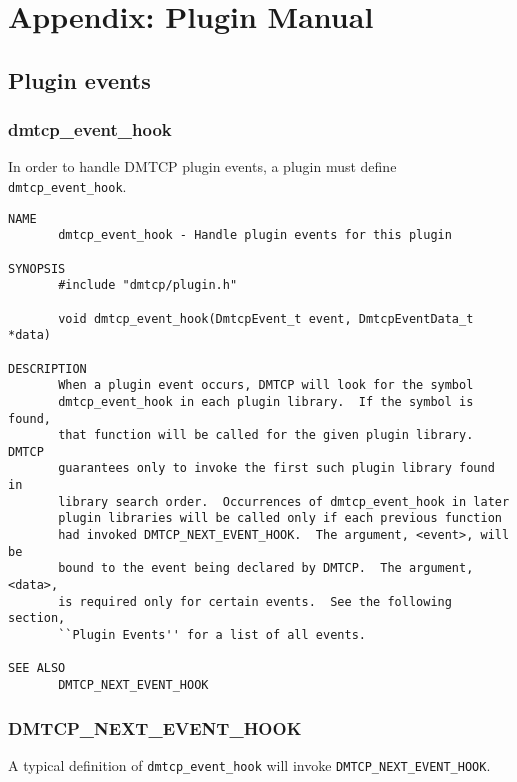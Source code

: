 \documentclass{article}
\begin{document}
\appendix
\section{Appendix:  Plugin Manual}
\subsection{Plugin events}

\subsubsection{dmtcp\_event\_hook}

In order to handle DMTCP plugin events, a plugin must
define {\tt dmtcp\_event\_hook}.

\begin{verbatim}
NAME
       dmtcp_event_hook - Handle plugin events for this plugin

SYNOPSIS
       #include "dmtcp/plugin.h"

       void dmtcp_event_hook(DmtcpEvent_t event, DmtcpEventData_t *data)

DESCRIPTION
       When a plugin event occurs, DMTCP will look for the symbol
       dmtcp_event_hook in each plugin library.  If the symbol is found,
       that function will be called for the given plugin library.  DMTCP
       guarantees only to invoke the first such plugin library found in
       library search order.  Occurrences of dmtcp_event_hook in later
       plugin libraries will be called only if each previous function
       had invoked DMTCP_NEXT_EVENT_HOOK.  The argument, <event>, will be
       bound to the event being declared by DMTCP.  The argument, <data>,
       is required only for certain events.  See the following section,
       ``Plugin Events'' for a list of all events.

SEE ALSO
       DMTCP_NEXT_EVENT_HOOK
\end{verbatim}

\subsubsection{DMTCP\_NEXT\_EVENT\_HOOK}

A typical definition of {\tt dmtcp\_event\_hook} will invoke
{\tt DMTCP\_NEXT\_EVENT\_HOOK}.
\end{document}
